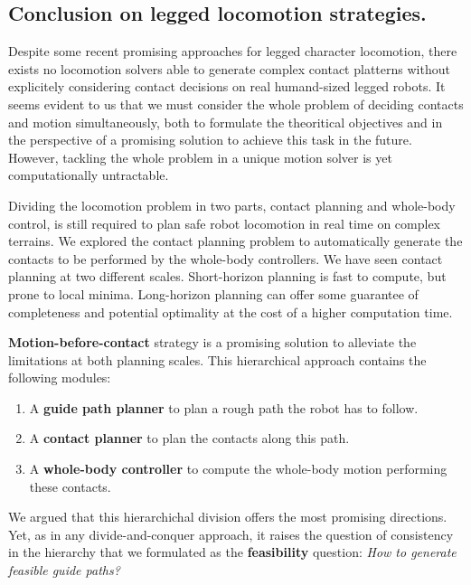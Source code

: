 \subsection{Conclusion on legged locomotion strategies.}

Despite some recent promising approaches for legged character locomotion, there exists no locomotion solvers able to generate complex contact platterns without explicitely considering contact decisions on real humand-sized legged robots.
It seems evident to us that we must consider the whole problem of deciding contacts and motion simultaneously, both to formulate the theoritical objectives and in the perspective of a promising solution to achieve this task in the future.
However, tackling the whole problem in a unique motion solver is yet computationally untractable.

Dividing the locomotion problem in two parts, contact planning and whole-body control, is still required to plan safe robot locomotion in real time on complex terrains.
We explored the contact planning problem to automatically generate the contacts to be performed by the whole-body controllers.
We have seen contact planning at two different scales.
Short-horizon planning is fast to compute, but prone to local minima.
Long-horizon planning can offer some guarantee of completeness and potential optimality at the cost of a higher computation time.

\textbf{Motion-before-contact} strategy is a promising solution to alleviate the limitations at both planning scales. 
This hierarchical approach contains the following modules:
\begin{enumerate}
    \item A \textbf{guide path planner} to plan a rough path the robot has to follow.
    \item A \textbf{contact planner} to plan the contacts along this path.
    \item A \textbf{whole-body controller} to compute the whole-body motion performing these contacts.
\end{enumerate}
We argued that this hierarchichal division offers the most promising directions. Yet, as in any divide-and-conquer approach, it raises the question of consistency in the hierarchy that we formulated as the \textbf{feasibility} question: \textit{How to generate feasible guide paths?}

